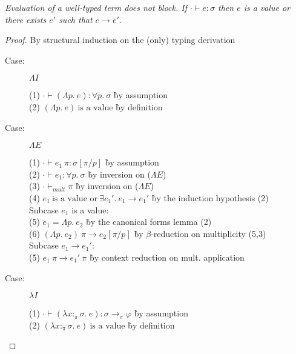 
\begin{theorem}[Progress]
\emph{Evaluation of a well-typed term does not block. If $\cdot \vdash e :
  \sigma$ then $e$ is a value or there exists $e'$ such that $e \longrightarrow e'$.}
\end{theorem}

\begin{proof}
By structural induction on the (only) typing derivation

\begin{description}

\item[Case:] $\Lambda I$
\begin{tabbing}
(1) $\cdot \vdash (\Lambda p.~e) : \forall p.~\sigma$ \` by assumption \\
(2) $(\Lambda p.~e)~\textrm{is a value}$ \` by definition \\
\end{tabbing}

\item[Case:] $\Lambda E$
\begin{tabbing}
(1) $\cdot \vdash e_1~\pi : \sigma[\pi/p]$ \` by assumption \\
(2) $\cdot \vdash e_1 : \forall p.~\sigma$ \` by inversion on ($\Lambda E$) \\
(3) $\cdot \vdash_{mult} \pi$ \` by inversion on ($\Lambda E$) \\
(4) $e_1~\textrm{is a value or}~\exists e_1'.~e_1 \longrightarrow e_1'$ \` by the induction hypothesis (2) \\
\textrm{Subcase $e_1$ is a value:}\\
(5) $e_1 = \Lambda p.~e_2$ \` by the canonical forms lemma (2) \\
(6) $(\Lambda p.~e_2)~\pi \longrightarrow e_2[\pi/p]$ \` by $\beta$-reduction on multiplicity (5,3) \\
\textrm{Subcase $e_1 \longrightarrow e_1'$:}\\
(5) $e_1~\pi \longrightarrow e_1'~\pi$ \` by context reduction on mult. application \\
\end{tabbing}

\item[Case:] $\lambda I$
\begin{tabbing}
(1) $\cdot \vdash (\lambda x{:}_\pi\sigma.~e) : \sigma\to_\pi\varphi$ \` by assumption \\
(2) $(\lambda x{:}_\pi\sigma.~e)~\textrm{is a value}$ \` by definition \\
\end{tabbing}


\end{description}
\end{proof}
